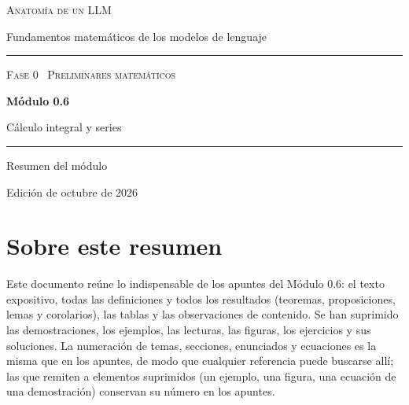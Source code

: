 \documentclass[11pt,a4paper,twoside,openany]{book}
\begin{document}
\frontmatter
\begin{titlepage}
\centering
\vspace*{2.5cm}
{\large\scshape Anatomía de un LLM}\par
\vspace{0.4cm}
{\normalsize Fundamentos matemáticos de los modelos de lenguaje}\par
\vspace{2.2cm}
\rule{\textwidth}{0.8pt}\par\vspace{0.5cm}
{\small\scshape Fase 0 \textperiodcentered\ Preliminares matemáticos}\par\vspace{0.3cm}
{\Huge\bfseries Módulo 0.6\par}\vspace{0.3cm}
{\LARGE Cálculo integral y series\par}
\vspace{0.5cm}\rule{\textwidth}{0.4pt}\par
\vspace{1.6cm}
{\large Resumen del módulo}\par
\vfill
{\small Edición de octubre de 2026}\par
\end{titlepage}

\chapter*{Sobre este resumen}

Este documento reúne lo indispensable de los apuntes del Módulo 0.6: el texto expositivo, todas las definiciones y todos los resultados (teoremas, proposiciones, lemas y corolarios), las tablas y las observaciones de contenido. Se han suprimido las demostraciones, los ejemplos, las lecturas, las figuras, los ejercicios y sus soluciones. La numeración de temas, secciones, enunciados y ecuaciones es la misma que en los apuntes, de modo que cualquier referencia puede buscarse allí; las que remiten a elementos suprimidos (un ejemplo, una figura, una ecuación de una demostración) conservan su número en los apuntes.
\end{document}

